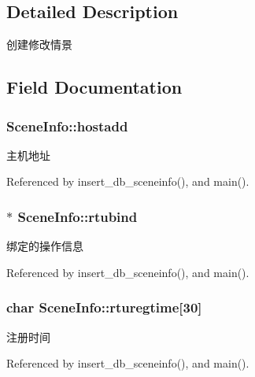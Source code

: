 \subsection{Detailed Description}
创建修改情景 

\subsection{Field Documentation}
\hypertarget{structSceneInfo_a71c350f2eecece851424fb6d41f3d0e1}{
\subsubsection[{hostadd}]{ Scene\-Info\-::hostadd}}\label{structSceneInfo_a71c350f2eecece851424fb6d41f3d0e1}


主机地址 



Referenced by insert\-\_\-db\-\_\-sceneinfo(), and main().

\hypertarget{structSceneInfo_a04797a4b852763ec79262575bb8d3f67}{
\subsubsection[{rtubind}]{$\ast$ Scene\-Info\-::rtubind}}\label{structSceneInfo_a04797a4b852763ec79262575bb8d3f67}


绑定的操作信息 



Referenced by insert\-\_\-db\-\_\-sceneinfo(), and main().

\hypertarget{structSceneInfo_ac27ed61e7e699160d08904fb2abfdb95}{
\subsubsection[{rturegtime}]{\setlength{\rightskip}{0pt plus 5cm}char Scene\-Info\-::rturegtime\mbox{[}30\mbox{]}}}\label{structSceneInfo_ac27ed61e7e699160d08904fb2abfdb95}


注册时间 



Referenced by insert\-\_\-db\-\_\-sceneinfo(), and main().

